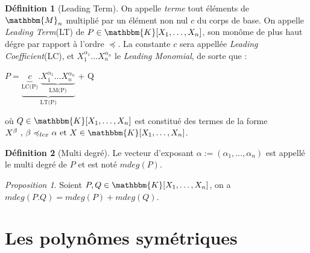 \documentclass[12pt]{article}
\theoremstyle{remark}\newtheorem{note}{Note}
\theoremstyle{remark}\newtheorem{nota}{Notation}
\newcommand{\M}{\mathbbm{M}}
\newcommand{\K}{\mathbbm{K}}
\newcommand{\ord}{\preccurlyeq}
\newtheorem{prop}{Proposition}
\theoremstyle{definition}
\newtheorem{definition}{Définition}
\begin{document}
\begin{definition}[Leading Term]
On appelle \textit{terme} tout éléments de $\M_n$ multiplié par un élément non nul $c$ du corps de base. \newline
On appelle \textit{Leading Term}(LT) de $P\in \K[X_1, \ldots, X_n]$, son monôme de plus haut dégre par rapport à l'ordre $\ord$. \newline
La constante $c$ sera appellée \textit{Leading Coefficient}(LC), et $X_1^{\alpha_1}\ldots X_n^{\alpha_n}$ le \textit{Leading Monomial}, de sorte que :
\begin{center} $P = \underbrace{\underbrace{c}_\textrm{LC(P)}.\underbrace{X_1^{\alpha_1}\ldots X_n^{\alpha_n}}_\textrm{LM(P)}}_\textrm{LT(P)}$  + Q \end{center}
où $Q\in \K[X_1, \ldots, X_n]$ est constitué des termes de la forme $X^\beta \text{ , } \beta \ord_{lex} \alpha \text{ et } X \in\K[X_1, \ldots, X_n]$.
\end{definition}

\begin{definition}[Multi degré]
Le vecteur d'exposant $\alpha := (\alpha_1,\ldots, \alpha_n)$ est appellé le multi degré de $P$ et est noté $mdeg(P)$.
\end{definition}

\begin{prop}
Soient $P,Q \in\K[X_1, \ldots, X_n]$, on a $mdeg(P.Q) = mdeg(P) + mdeg(Q)$.
\end{prop}

\pagebreak

\section{Les polynômes symétriques}
\end{document}
